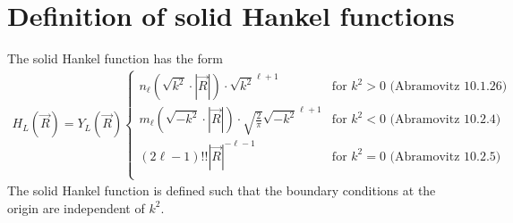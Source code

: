 \documentclass[11pt,a4paper]{report}
\begin{document}
\chapter{Definition of solid Hankel functions}
\label{app:solidhankel}
The solid Hankel function has the form
\begin{eqnarray}
H_L(\vec{R})=Y_L(\vec{R})
\begin{cases}
n_\ell(\sqrt{k^2}\cdot|\vec{R}|) \cdot \sqrt{k^2}^{\ell+1}
&\text{for $k^2>0$  (Abramovitz 10.1.26)}\\
m_\ell(\sqrt{-k^2}\cdot|\vec{R}|) \cdot \sqrt{\frac{2}{\pi}} \sqrt{-k^2}^{\ell+1}
&\text{for $k^2<0$  (Abramovitz 10.2.4)}\\
(2\ell-1)!! |\vec{R}|^{-\ell-1} 
&\text{for $k^2=0$  (Abramovitz 10.2.5)}\\
\end{cases}
\end{eqnarray}
The solid Hankel function is defined such that the boundary conditions
at the origin are independent of $k^2$.
\end{document}
